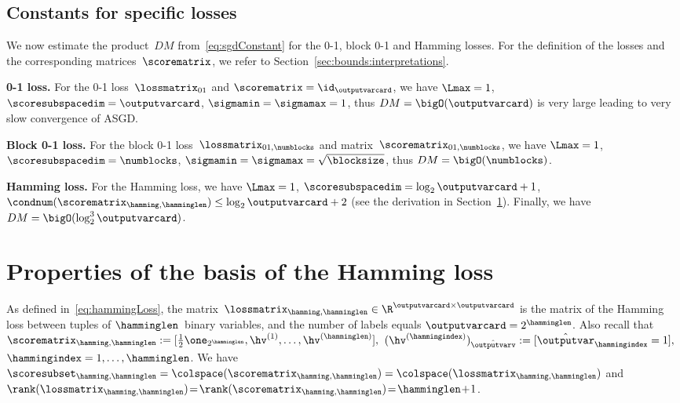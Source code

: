 \documentclass{article}
\begin{document}
\subsection{Constants for specific losses}
\label{sec:tranferAndSgd:constants}
We now estimate the product~$DM$ from~\eqref{eq:sgdConstant} for the 0-1, block 0-1 and Hamming losses.
For the definition of the losses and the corresponding matrices~$\scorematrix$, we refer to Section~\ref{sec:bounds:interpretations}.

\textbf{0-1 loss.}
For the 0-1 loss~$\lossmatrix_{01}$ and $\scorematrix = \id_\outputvarcard$, we have $\Lmax=1$, $\scoresubspacedim=\outputvarcard$, $\sigmamin=\sigmamax=1$, thus $DM = \bigO(\outputvarcard)$ is very large leading to very slow convergence of ASGD.

\textbf{Block 0-1 loss.}
For the block 0-1 loss~$\lossmatrix_{01,\numblocks}$ and matrix~$\scorematrix_{01,\numblocks}$, we have $\Lmax=1$, $\scoresubspacedim=\numblocks$, $\sigmamin=\sigmamax=\sqrt{\blocksize}$, thus $DM = \bigO(\numblocks)$.

\textbf{Hamming loss.} For the Hamming loss, we have $\Lmax=1$, $\scoresubspacedim=\log_2 \outputvarcard + 1$, $\condnum(\scorematrix_{\hamming,\hamminglen}) \leq \log_2{\outputvarcard}+2$ (see the derivation in Section~\ref{sec:hammingLossProps}). Finally, we have $DM = \bigO(\log_2^3 \outputvarcard)$.


%
%
%
%
%
%
%
%
%
%
%
%
%
%
%
%
%
%
%
%
%
%
%
%
%
%
%
%
%
%
%
%
%
%
%
%
%
%
%
%
%
%
%
%
%
%
%
%
%
%
%
%
%
%
%
%

%
%
%
%
%
%
%
%
%
%
%
%
%
%
%
%
%
%


\section{Properties of the basis of the Hamming loss}
\label{sec:hammingLossProps}
As defined in~\eqref{eq:hammingLoss}, the matrix~$\lossmatrix_{\hamming,\hamminglen} \in \R^{\outputvarcard \times \outputvarcard}$ is the matrix of the Hamming loss between tuples of $\hamminglen$~binary variables, and the number of labels equals $\outputvarcard = 2^\hamminglen$.
Also recall that
$
\scorematrix_{\hamming,\hamminglen} := [ \frac12 \one_{2^\hamminglen}, \hv^{(1)}, \dots, \hv^{(\hamminglen)} ],
$
$
(\hv^{(\hammingindex)})_{\hat{\outputvarv}} := [\hat{\outputvar}_\hammingindex = 1],
$
$\hammingindex = 1,\dots,\hamminglen$.
We have $
\scoresubset_{\hamming,\hamminglen}
=
\colspace(\scorematrix_{\hamming,\hamminglen})
=
\colspace(\lossmatrix_{\hamming,\hamminglen})
$
 and $\rank(\lossmatrix_{\hamming,\hamminglen}) \!=\! \rank(\scorematrix_{\hamming,\hamminglen}) \!=\! \hamminglen\!+\!1$.
\end{document}
